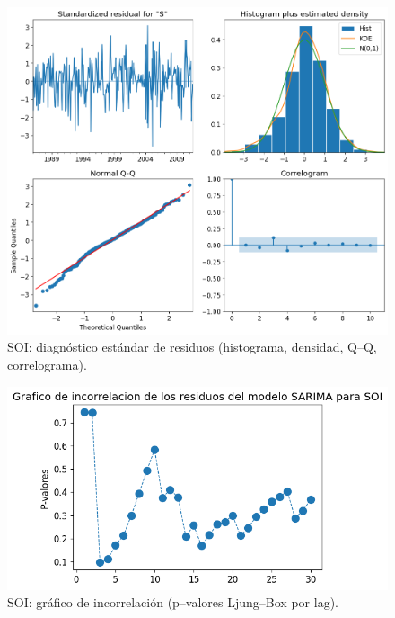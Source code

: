 \begin{figure}[H]\centering
\includegraphics[scale=.52]{Figures/res_std_soi.png}
\caption{SOI: diagnóstico estándar de residuos (histograma, densidad, Q--Q, correlograma).}
\label{fig:std_soi}
\end{figure}

\begin{figure}[H]\centering
\includegraphics[scale=.52]{Figures/inco_soi.png}
\caption{SOI: gráfico de incorrelación (p--valores Ljung--Box por lag).}
\label{fig:inco_soi}
\end{figure}



